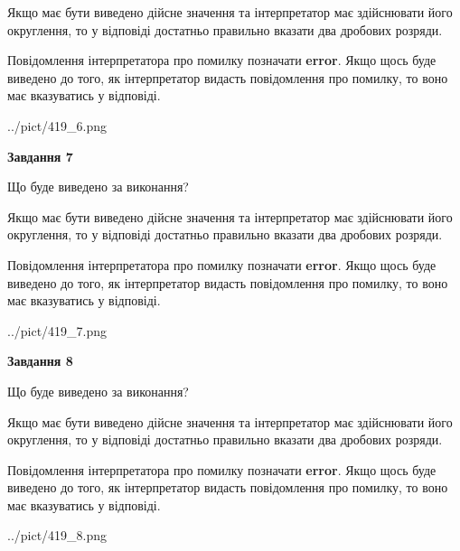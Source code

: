 \documentclass[12pt, ukrainian]{article}
\begin{document}
{\begin {Large}
Якщо має бути виведено дійсне значення та інтерпретатор має здійснювати його округлення, 
то у відповіді достатньо правильно вказати два дробових розряди.

Повідомлення інтерпретатора про помилку позначати \textbf{error}.
Якщо щось буде виведено до того, як інтерпретатор видасть повідомлення про помилку, 
то воно має вказуватись у відповіді. \par

\begin{center}
	{../pict/419_6.png}
\end{center}
\newpage

{\begin {center}\textbf{Завдання 7}\end {center}}\par
Що буде виведено за виконання? \par

Якщо має бути виведено дійсне значення та інтерпретатор має здійснювати його округлення, 
то у відповіді достатньо правильно вказати два дробових розряди.

Повідомлення інтерпретатора про помилку позначати \textbf{error}.
Якщо щось буде виведено до того, як інтерпретатор видасть повідомлення про помилку, 
то воно має вказуватись у відповіді. \par

\begin{center}
	{../pict/419_7.png}
\end{center}
\newpage

{\begin {center}\textbf{Завдання 8}\end {center}}\par
Що буде виведено за виконання? \par

Якщо має бути виведено дійсне значення та інтерпретатор має здійснювати його округлення, 
то у відповіді достатньо правильно вказати два дробових розряди.

Повідомлення інтерпретатора про помилку позначати \textbf{error}.
Якщо щось буде виведено до того, як інтерпретатор видасть повідомлення про помилку, 
то воно має вказуватись у відповіді. \par

\begin{center}
	{../pict/419_8.png}
\end{center}
\newpage


\end{Large}}
\end{document}
